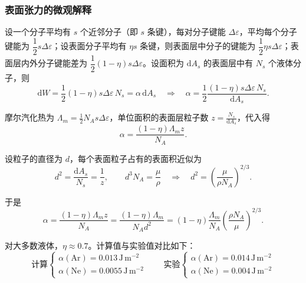 \documentclass[UTF8]{ctexart}
\theoremstyle{definition}
\begin{document}
\subsubsection*{表面张力的微观解释}

设一个分子平均有 $s$ 个近邻分子（即 $s$ 条键），每对分子键能 $\Delta\varepsilon$，平均每个分子键能为 $\dfrac{1}{2}s\Delta\varepsilon$；设表面分子平均有 $\eta s$ 条键，则表面层中分子的键能为 $\dfrac{1}{2}\eta s\Delta\varepsilon$；表面层内外分子键能差为 $\dfrac{1}{2}(1-\eta)s\Delta\varepsilon$。设面积为 $\mathrm{d}A_s$ 的表面层中有 $N_s$ 个液体分子，则
\begin{equation}
\mathrm{d}W = \frac{1}{2}(1-\eta)s\Delta\varepsilon\,N_s = \alpha\,\mathrm{d}A_s
\quad\Rightarrow\quad
\alpha = \frac{1}{2}\frac{(1-\eta)s\Delta\varepsilon\,N_s}{\mathrm{d}A_s}.
\end{equation}

摩尔汽化热为 $\displaystyle\Lambda_m = \frac{1}{2}N_A s\Delta\varepsilon$，单位面积的表面层粒子数 $\displaystyle z = \frac{N_s}{\mathrm{d}A_s}$，代入得
\begin{equation}
\alpha = \frac{(1-\eta)\Lambda_m z}{N_A}.
\end{equation}

设粒子的直径为 $d$，每个表面粒子占有的表面积近似为
\begin{equation}
d^2 = \frac{\mathrm{d}A_s}{N_s} = \frac{1}{z},\qquad
d^3 N_A = \frac{\mu}{\rho}
\quad\Rightarrow\quad
d^2 = \left(\frac{\mu}{\rho N_A}\right)^{2/3}.
\end{equation}

于是
\begin{equation}
\alpha = \frac{(1-\eta)\Lambda_m z}{N_A}
= \frac{(1-\eta)\Lambda_m}{N_A d^2}
= (1-\eta)\frac{\Lambda_m}{N_A}\left(\frac{\rho N_A}{\mu}\right)^{2/3}.
\end{equation}

对大多数液体，$\eta \approx 0.7$。计算值与实验值对比如下：
\begin{equation*}
\text{计算}\begin{cases}
\alpha(\mathrm{Ar}) = 0.013\,\mathrm{J\,m^{-2}}\\
\alpha(\mathrm{Ne}) = 0.0055\,\mathrm{J\,m^{-2}}
\end{cases}
\qquad
\text{实验}\begin{cases}
\alpha(\mathrm{Ar}) = 0.014\,\mathrm{J\,m^{-2}}\\
\alpha(\mathrm{Ne}) = 0.004\,\mathrm{J\,m^{-2}}
\end{cases}
\end{equation*}
\end{document}
